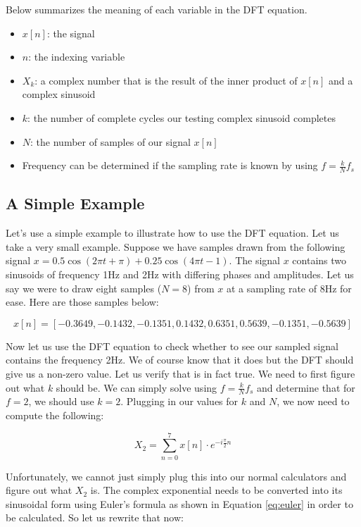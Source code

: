 Below summarizes the meaning of each variable in the DFT equation.

\begin{itemize}
	\item $x[n]$: the signal
	\item $n$: the indexing variable
	\item $X_k$: a complex number that is the result of the inner product of $x[n]$ and a complex sinusoid
	\item $k$: the number of complete cycles our testing complex sinusoid completes
	\item $N$: the number of samples of our signal $x[n]$
	\item Frequency can be determined if the sampling rate is known by using $f = \frac{k}{N}f_s$
\end{itemize}

\subsection*{A Simple Example}

Let's use a simple example to illustrate how to use the DFT equation.  Let us take a very small example.  Suppose
we have samples drawn from the following signal $x = 0.5\cos(2\pi t + \pi) + 0.25\cos(4\pi t - 1)$.  The signal
$x$ contains two sinusoids of frequency 1Hz and 2Hz with differing phases and amplitudes.  Let us say we
were to draw eight samples ($N = 8$) from $x$ at a sampling rate of 8Hz for ease.  Here are those samples below:

$$x[n] = [-0.3649, -0.1432, -0.1351, 0.1432, 0.6351, 0.5639, -0.1351, -0.5639]$$

Now let us use the DFT equation to check whether to see our sampled signal contains the frequency 2Hz.  We 
of course know that it does but the DFT should give us a non-zero value.  Let us verify that is in fact true.  We
need to first figure out what $k$ should be.  We can simply solve using $f = \frac{k}{N}f_s$ and determine that
for $f = 2$, we should use $k = 2$.  Plugging in our values for $k$ and $N$, we now need to compute the following:

$$X_2 = \sum_{n = 0}^{7}x[n] \cdot e^{-i\frac{\pi}{2}n}$$

Unfortunately, we cannot just simply plug this into our normal calculators and figure out what $X_2$ is.  The complex exponential needs to be converted into its sinusoidal form using Euler's formula as shown in Equation
 \ref{eq:euler} in order to be calculated.  So let us rewrite that now:

